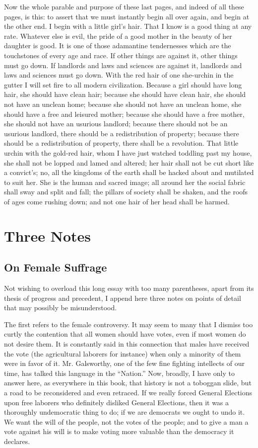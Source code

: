 \documentclass{book}
\begin{document}
Now the whole parable and purpose of these last pages, and indeed of all these pages, is this: to assert that we must instantly begin all over again, and begin at the other end. I begin with a little girl’s hair. That I know is a good thing at any rate. Whatever else is evil, the pride of a good mother in the beauty of her daughter is good. It is one of those adamantine tendernesses which are the touchstones of every age and race. If other things are against it, other things must go down. If landlords and laws and sciences are against it, landlords and laws and sciences must go down. With the red hair of one she-urchin in the gutter I will set fire to all modern civilization. Because a girl should have long hair, she should have clean hair; because she should have clean hair, she should not have an unclean home; because she should not have an unclean home, she should have a free and leisured mother; because she should have a free mother, she should not have an usurious landlord; because there should not be an usurious landlord, there should be a redistribution of property; because there should be a redistribution of property, there shall be a revolution. That little urchin with the gold-red hair, whom I have just watched toddling past my house, she shall not be lopped and lamed and altered; her hair shall not be cut short like a convict’s; no, all the kingdoms of the earth shall be hacked about and mutilated to suit her. She is the human and sacred image; all around her the social fabric shall sway and split and fall; the pillars of society shall be shaken, and the roofs of ages come rushing down; and not one hair of her head shall be harmed.

\setcounter{chapter}{0}\part{Three Notes}
\label{chapter-52}
\chapter{On Female Suffrage}
\label{chapter-53}
Not wishing to overload this long essay with too many parentheses, apart from its thesis of progress and precedent, I append here three notes on points of detail that may possibly be misunderstood.

The first refers to the female controversy. It may seem to many that I dismiss too curtly the contention that all women should have votes, even if most women do not desire them. It is constantly said in this connection that males have received the vote (the agricultural laborers for instance) when only a minority of them were in favor of it. Mr. Galsworthy, one of the few fine fighting intellects of our time, has talked this language in the “Nation.” Now, broadly, I have only to answer here, as everywhere in this book, that history is not a toboggan slide, but a road to be reconsidered and even retraced. If we really forced General Elections upon free laborers who definitely disliked General Elections, then it was a thoroughly undemocratic thing to do; if we are democrats we ought to undo it. We want the will of the people, not the votes of the people; and to give a man a vote against his will is to make voting more valuable than the democracy it declares.
\end{document}
